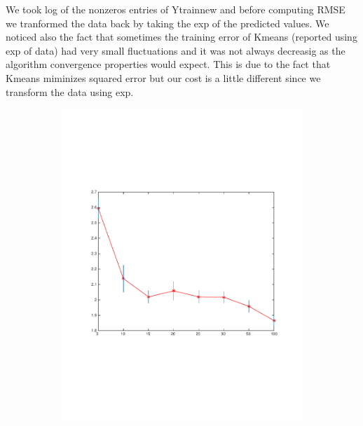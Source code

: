 We took log of the nonzeros entries of Ytrainnew and before 
computing RMSE we tranformed the data back by taking the exp
of the predicted values.
We noticed also the fact that sometimes the training error of Kmeans
(reported using exp of data) had very small fluctuations and it was not always decreasig as the algorithm convergence properties would expect. This is due to the fact that Kmeans miminizes squared error but our cost is a little different since we transform the data using exp.

\begin{figure}[h]
  \centering
  \begin{subfigure}[b]{0.45\textwidth}
   \includegraphics[width=\textwidth]{figures/kmeans_train.pdf}
    \caption{}
  \end{subfigure}
  \begin{subfigure}[b]{0.45\textwidth}

\end{subfigure}
\end{figure}

